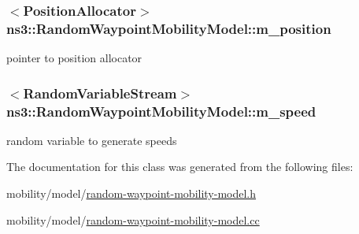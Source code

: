 \subsubsection[{\texorpdfstring{m\+\_\+position}{m_position}}]{$<${\bf Position\+Allocator}$>$ ns3\+::\+Random\+Waypoint\+Mobility\+Model\+::m\+\_\+position\hspace{0.3cm}{\ttfamily [private]}}\hypertarget{classns3_1_1RandomWaypointMobilityModel_a5403d3195d0dd7afee4de130d9dc8a14}{}\label{classns3_1_1RandomWaypointMobilityModel_a5403d3195d0dd7afee4de130d9dc8a14}


pointer to position allocator 

\subsubsection[{\texorpdfstring{m\+\_\+speed}{m_speed}}]{$<${\bf Random\+Variable\+Stream}$>$ ns3\+::\+Random\+Waypoint\+Mobility\+Model\+::m\+\_\+speed\hspace{0.3cm}{\ttfamily [private]}}\hypertarget{classns3_1_1RandomWaypointMobilityModel_a573f6a14ec00b07199fa6445f006f4ba}{}\label{classns3_1_1RandomWaypointMobilityModel_a573f6a14ec00b07199fa6445f006f4ba}


random variable to generate speeds 



The documentation for this class was generated from the following files\+:\begin{DoxyCompactItemize}
\item 
mobility/model/\hyperlink{random-waypoint-mobility-model_8h}{random-\/waypoint-\/mobility-\/model.\+h}\item 
mobility/model/\hyperlink{random-waypoint-mobility-model_8cc}{random-\/waypoint-\/mobility-\/model.\+cc}\end{DoxyCompactItemize}
